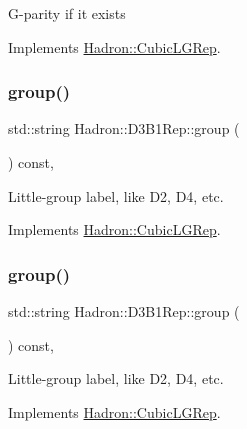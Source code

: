 G-\/parity if it exists 

Implements \mbox{\hyperlink{structHadron_1_1CubicLGRep_ace26f7b2d55e3a668a14cb9026da5231}{Hadron\+::\+Cubic\+L\+G\+Rep}}.

\mbox{\label{structHadron_1_1D3B1Rep_a2a200d92b086e79b44d9df923fa30fb4}} 
\subsubsection{\texorpdfstring{group()}{group()}\hspace{0.1cm}{\footnotesize\ttfamily [1/3]}}
{\footnotesize\ttfamily std\+::string Hadron\+::\+D3\+B1\+Rep\+::group (\begin{DoxyParamCaption}{ }\end{DoxyParamCaption}) const\hspace{0.3cm}{\ttfamily [inline]}, {\ttfamily [virtual]}}

Little-\/group label, like D2, D4, etc. 

Implements \mbox{\hyperlink{structHadron_1_1CubicLGRep_a9bdb14b519a611d21379ed96a3a9eb41}{Hadron\+::\+Cubic\+L\+G\+Rep}}.

\mbox{\label{structHadron_1_1D3B1Rep_a2a200d92b086e79b44d9df923fa30fb4}} 
\subsubsection{\texorpdfstring{group()}{group()}\hspace{0.1cm}{\footnotesize\ttfamily [2/3]}}
{\footnotesize\ttfamily std\+::string Hadron\+::\+D3\+B1\+Rep\+::group (\begin{DoxyParamCaption}{ }\end{DoxyParamCaption}) const\hspace{0.3cm}{\ttfamily [inline]}, {\ttfamily [virtual]}}

Little-\/group label, like D2, D4, etc. 

Implements \mbox{\hyperlink{structHadron_1_1CubicLGRep_a9bdb14b519a611d21379ed96a3a9eb41}{Hadron\+::\+Cubic\+L\+G\+Rep}}.

\mbox{\label{structHadron_1_1D3B1Rep_a2a200d92b086e79b44d9df923fa30fb4}} 
